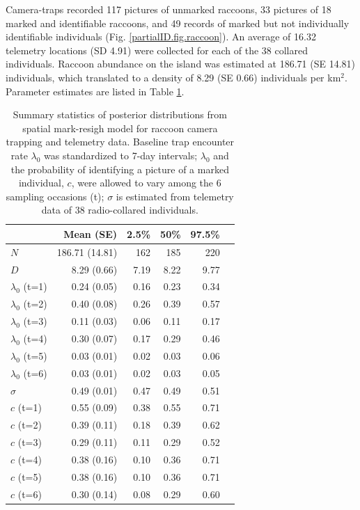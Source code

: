 Camera-traps recorded 117 pictures of unmarked raccoons, 33 pictures
of 18 marked and identifiable raccoons, and 49 records of marked but
not individually identifiable individuals
(Fig. \ref{partialID.fig.raccoon}). An average of 16.32 telemetry
locations (SD 4.91) were collected for each of the 38 collared
individuals. Raccoon abundance on the island was estimated at 186.71
(SE 14.81) individuals, which translated to a density of 8.29 (SE
0.66) individuals per km$^2$. Parameter estimates are listed in
Table \ref{partialID.tab.raccoons}.

\begin{table}%
\centering
\caption{Summary statistics of posterior distributions
from spatial mark-resigh model for raccoon camera trapping and telemetry data. Baseline trap encounter rate $\lambda_0$ was standardized to 7-day intervals; $\lambda_0$ and the probability of identifying a picture of a marked individual, $c$, were allowed to vary among the 6 sampling occasions (t); $\sigma$ is estimated from telemetry data of 38 radio-collared individuals.}
\begin{tabular}{lrrrrr}
\hline
   &	Mean (SE) &	2.5\% &	50\%	& 97.5\% \\
 \hline
$N$	& 186.71 (14.81) & 162 & 185	& 220 \\
$D$	& 8.29 (0.66)	& 7.19	& 8.22	& 9.77 \\
$\lambda_0$ (t=1)	& 0.24 (0.05) & 0.16 & 0.23 & 0.34 \\
$\lambda_0$ (t=2)	& 0.40 (0.08)	& 0.26	& 0.39	& 0.57 \\
$\lambda_0$ (t=3)	& 0.11 (0.03) & 0.06 & 0.11	& 0.17 \\
$\lambda_0$ (t=4)	& 0.30 (0.07)	& 0.17	& 0.29	& 0.46 \\
$\lambda_0$ (t=5)	& 0.03 (0.01)	& 0.02	& 0.03	& 0.06 \\
$\lambda_0$ (t=6)	& 0.03 (0.01)	& 0.02	& 0.03	& 0.05 \\
$\sigma$	& 0.49 (0.01)	& 0.47	& 0.49	& 0.51 \\
$c$ (t=1)	& 0.55 (0.09)	& 0.38	& 0.55	& 0.71 \\
$c$ (t=2)	& 0.39 (0.11)	& 0.18	& 0.39	& 0.62 \\
$c$ (t=3)	& 0.29 (0.11) & 0.11	& 0.29	& 0.52 \\
$c$ (t=4)	& 0.38 (0.16)	& 0.10	& 0.36	& 0.71 \\
$c$ (t=5)	& 0.38 (0.16)	& 0.10	& 0.36	& 0.71 \\
$c$ (t=6)	& 0.30 (0.14)	& 0.08	& 0.29	& 0.60 \\
 \hline
\end{tabular}
\label{partialID.tab.raccoons}
\end{table}

